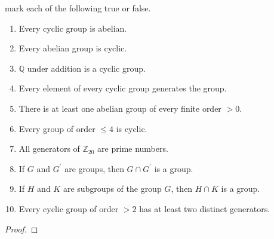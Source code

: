 \documentclass[12pt]{amsart}
\theoremstyle{definition}
\numberwithin{equation}{section}
\theoremstyle{plain}
\newcommand{\Z}{\mathbb{Z}}
\newcommand{\Q}{\mathbb{Q}}
\begin{document}
    \begin{exercise}{32} mark each of the following true or false.
        \begin{enumerate}[label=(\alph*.)]
            \item Every cyclic group is abelian.
            \item Every abelian group is cyclic.
            \item $\Q$ under addition is a cyclic group.
            \item Every element of every cyclic group generates the group.
            \item There is at least one abelian group of every finite order $>0$.
            \item Every group of order $\leq4$ is cyclic.
            \item All generators of $\Z_{20}$ are prime numbers.
            \item If $G$ and $G^\prime$ are groups, then $G \cap G^\prime$ is a group.
            \item If $H$ and $K$ are subgroups of the group $G$, then $H \cap K$ is a group.
            \item Every cyclic group of order $>2$ has at least two distinct generators.
        \end{enumerate}
        \begin{proof}
        \end{proof}
    \end{exercise}
\end{document}
